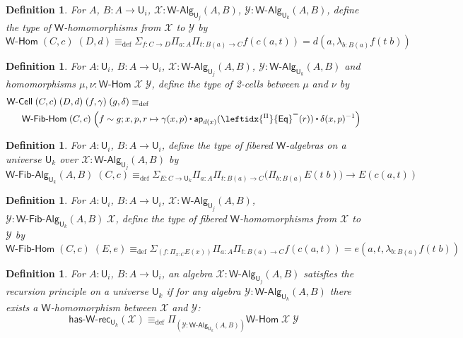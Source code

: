 \documentclass[reqno,10pt,a4paper,oneside]{amsart}
\numberwithin{equation}{section}
\theoremstyle{mythm}
\theoremstyle{mydef}
\newtheorem{definition}[theorem]{Definition}
\theoremstyle{myrmk}
\newcommand{\deq}{\equiv}
\newcommand{\defeq}{\deq_{\mathrm{def}}}
\newcommand{\ct}{%
  \mathchoice{\mathbin{\raisebox{0.5ex}{$\displaystyle\centerdot$}}}%
             {\mathbin{\raisebox{0.5ex}{$\centerdot$}}}%
             {\mathbin{\raisebox{0.25ex}{$\scriptstyle\,\centerdot\,$}}}%
             {\mathbin{\raisebox{0.1ex}{$\scriptscriptstyle\,\centerdot\,$}}}}
\newcommand{\funext}{\leftidx{^\Pi}{\mathsf{Eq}}^{=}}
\newcommand{\prd}[1]{\Pi_{#1}}
\newcommand{\sm}[1]{\Sigma_{#1}}
\newcommand{\lam}[1]{\lambda_{#1}}
\newcommand{\app}{\mathsf{ap}}
\newcommand{\W}{\mathsf{W}}
\newcommand{\UU}{\mathsf{U}}
\newcommand{\WCell}{\mathsf{W}\text{-}\mathsf{Cell}}
\newcommand{\WAlg}{\mathsf{W}\text{-}\mathsf{Alg}}
\newcommand{\WFibAlg}{\mathsf{W}\text{-}\mathsf{Fib}\text{-}\mathsf{Alg}}
\newcommand{\WHom}{\mathsf{W}\text{-}\mathsf{Hom}}
\newcommand{\WFibHom}{\mathsf{W}\text{-}\mathsf{Fib}\text{-}\mathsf{Hom}}
\newcommand{\HasWRec}{\mathsf{has}\text{-}\mathsf{W}\text{-}\mathsf{rec}}
\newcommand{\X}{\mathcal{X}}
\newcommand{\Y}{\mathcal{Y}}
\begin{document}
\begin{definition}\label{def:WHom}
For $A$, $B : A \to \UU_i$, $\X : \WAlg_{\UU_j}(A,B)$, $\Y : \WAlg_{\UU_k}(A,B)$, define the type of \emph{$\W$-homomorphisms} from $\X$ to $\Y$ by
\[ \WHom \; (C,c) \; (D,d) \defeq \sm{f:C\to D}\prd{a:A}\prd{t: B(a) \to C} f(c(a,t)) = d(a,\lam{b:B(a)} f(t\;b)) \]
\end{definition}


\begin{definition}\label{def:WCell}
For $A:\UU_i$, $B : A \to \UU_i$, $\X : \WAlg_{\UU_j}(A,B)$, $\Y : \WAlg_{\UU_k}(A,B)$ and homomorphisms $\mu, \nu : \WHom \; \X \; \Y$, define the type of \emph{2-cells} between $\mu$ and $\nu$ by
\begin{align*} & \WCell \; (C,c) \; (D,d) \; (f,\gamma) \; (g,\delta) \defeq \\ & \;\;\; \;\;\;\WFibHom \; (C,c) \; \Big(f \sim g; x,p,r \mapsto \gamma(x,p) \ct \app_{d(x)}(\funext(r)) \ct \delta(x,p)^{-1}\Big)
\end{align*}
\end{definition}
%

\begin{definition}\label{def:WFibAlg}
For $A:\UU_i$, $B : A \to \UU_i$, define the type of \emph{fibered $\W$-algebras} on a universe $\UU_k$ over $\mathcal{X} : \WAlg_{\UU_j}(A,B)$ by
\[\WFibAlg_{\UU_k}(A,B) \; (C,c) \defeq \sm{E : C \to \UU_k} \prd{a:A}\prd{t: B(a) \to C} \big(\prd{b:B(a)} E(t \;b) \big) \to E(c(a,t)) \]
\end{definition}

\begin{definition}\label{def:WFibHom}
For $A:\UU_i$, $B : A \to \UU_i$, $\X : \WAlg_{\UU_j}(A,B)$, $\Y : \WFibAlg_{\UU_k}(A,B) \; \X$, define the type of \emph{fibered $\W$-homomorphisms} from $\X$ to $\Y$ by
\[ \WFibHom \; (C,c) \; (E,e) \defeq \sm{(f:\prd{x:C}E(x))}\prd{a:A}\prd{t: B(a) \to C} f(c(a,t)) = e(a,t,\lam{b:B(a)} f(t\;b)) \]
\end{definition}



\begin{definition}\label{def:WRec}
For $A:\UU_i$, $B : A \to \UU_i$, an algebra $\X : \WAlg_{\UU_j}(A,B)$ \emph{satisfies the recursion principle} on a universe $\UU_k$ if for any algebra $\Y : \WAlg_{\UU_k}(A,B)$ there exists
a $\W$-homomorphism between $\X$ and $\Y$:
\[ \HasWRec_{\UU_k}(\X) \defeq \prd{(\Y:\WAlg_{\UU_k}(A,B))} \WHom \; \X \; \Y \]
\end{definition}
\end{document}
